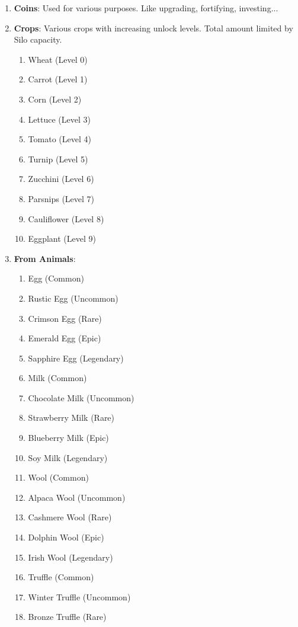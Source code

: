 \documentclass[12pt]{article}
\begin{document}
\begin{enumerate}
    \item \textbf{Coins}: Used for various purposes. Like upgrading, fortifying, investing...
    \item \textbf{Crops}: Various crops with increasing unlock levels. Total amount limited by Silo capacity.
    \begin{enumerate}
        \item Wheat (Level 0)
        \item Carrot (Level 1)
        \item Corn (Level 2)
        \item Lettuce (Level 3)
        \item Tomato (Level 4)
        \item Turnip (Level 5)
        \item Zucchini (Level 6)
        \item Parsnips (Level 7)
        \item Cauliflower (Level 8)
        \item Eggplant (Level 9)
    \end{enumerate}
    \item \textbf{From Animals}:
    \begin{enumerate}
        \item Egg (Common)
        \item Rustic Egg (Uncommon)
        \item Crimson Egg (Rare)
        \item Emerald Egg (Epic)
        \item Sapphire Egg (Legendary)
        \item Milk (Common)
        \item Chocolate Milk (Uncommon)
        \item Strawberry Milk (Rare)
        \item Blueberry Milk (Epic)
        \item Soy Milk (Legendary)
        \item Wool (Common)
        \item Alpaca Wool (Uncommon)
        \item Cashmere Wool (Rare)
        \item Dolphin Wool (Epic)
        \item Irish Wool (Legendary)
        \item Truffle (Common)
        \item Winter Truffle (Uncommon)
        \item Bronze Truffle (Rare)

\end{enumerate}
\end{enumerate}
\end{document}
